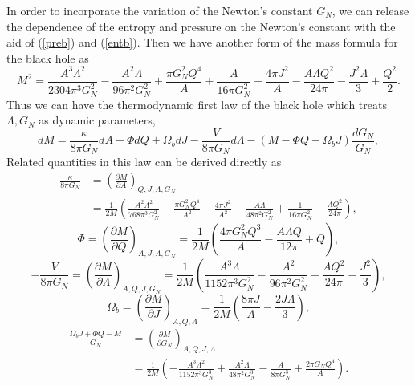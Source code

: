 \documentclass[a4paper,11pt]{article}
\newcommand{\eq}[1]{(\ref{#1})}
\begin{document}
In order to incorporate the variation of the Newton's constant $G_N$, we can release the dependence of the entropy and pressure on the Newton's constant with the aid of \eq{preb} and \eq{entb}. Then we have another form of the mass formula for the black hole as
\begin{equation}\label{mass1t}
M^2=\frac{A^3 \Lambda ^2}{2304 \pi ^3 G_N^2}-\frac{A^2 \Lambda }{96 \pi ^2 G_N^2}+\frac{\pi  G_N^2 Q^4}{A}+\frac{A}{16 \pi  G_N^2}+\frac{4 \pi  J^2}{A}-\frac{A \Lambda  Q^2}{24 \pi }-\frac{J^2 \Lambda }{3}+\frac{Q^2}{2}.
\end{equation}
Thus we can have the thermodynamic first law of the black hole which treats $\Lambda, G_N$ as dynamic parameters, 
\begin{equation}\label{fir2}
d M=\frac{\kappa}{8 \pi G_N} d A+\Phi d Q+\Omega_b dJ-\frac{V}{8 \pi G_N} d \Lambda-(M-\Phi Q-\Omega_b J) \frac{d G_N}{G_N},
\end{equation}
Related quantities in this law can be derived directly as
\begin{equation}
\begin{aligned}
\frac{\kappa}{8 \pi G_N}&=\left(\frac{\partial M}{\partial A}\right)_{Q, J, \Lambda, G_N}\\&=\frac{1}{2M}\left(\frac{A^2 \Lambda ^2}{768 \pi ^3 G_N^2}-\frac{\pi  G_N^2 Q^4}{A^2}-\frac{4 \pi  J^2}{A^2}-\frac{A \Lambda }{48 \pi ^2 G_N^2}+\frac{1}{16 \pi  G_N^2}-\frac{\Lambda  Q^2}{24 \pi }\right),
\end{aligned}
\end{equation}
\begin{equation}
\Phi=\left(\frac{\partial M}{\partial Q}\right)_{A, J, \Lambda, G_N}=\frac{1}{2M}\left(\frac{4 \pi  G_N^2 Q^3}{A}-\frac{A \Lambda  Q}{12 \pi }+Q\right),
\end{equation}
\begin{equation}
-\frac{V}{8 \pi G_N}=\left(\frac{\partial M}{\partial \Lambda}\right)_{A, Q, J, G_N}=\frac{1}{2M}\left(\frac{A^3 \Lambda }{1152 \pi ^3 G_N^2}-\frac{A^2}{96 \pi ^2 G_N^2}-\frac{A Q^2}{24 \pi }-\frac{J^2}{3}\right),
\end{equation}
\begin{equation}
\Omega_b=\left(\frac{\partial M}{\partial J}\right)_{A, Q, \Lambda}=\frac{1}{2M}\left(\frac{8 \pi  J}{A}-\frac{2 J \Lambda }{3}\right),
\end{equation}
\begin{equation}
\begin{aligned}
\frac{\Omega_b J+\Phi Q-M}{G_N}&=\left(\frac{\partial M}{\partial G_N}\right)_{A, Q, J, \Lambda}\\&=\frac{1}{2M}\left(-\frac{A^3 \Lambda ^2}{1152 \pi ^3 G_N^3}+\frac{A^2 \Lambda }{48 \pi ^2 G_N^3}-\frac{A}{8 \pi  G_N^3}+\frac{2 \pi  G_N Q^4}{A}\right).
\end{aligned}
\end{equation}
\end{document}
